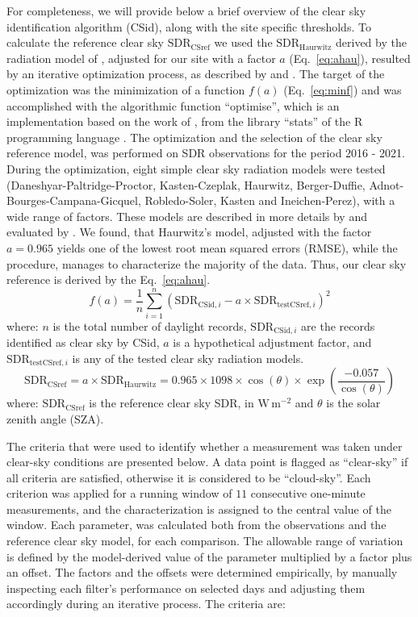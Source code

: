 \documentclass[applsci,article,submit,moreauthors,pdftex]{Definitions/mdpi}
\begin{document}
For completeness, we will provide below a brief overview of the clear
sky identification algorithm (CSid), along with the site specific
thresholds. To calculate the reference clear sky
\(\text{SDR}_\text{CSref}\) we used the \(\text{SDR}_\text{Haurwitz}\)
derived by the radiation model of \citet{Haurwitz1945}, adjusted for our
site with a factor \(a\) (Eq.~\ref{eq:ahau}), resulted by an iterative
optimization process, as described by \citet{Long2000} and
\citet{Reno2016}. The target of the optimization was the minimization of
a function \(f(a)\) (Eq.~\ref{eq:minf}) and was accomplished with the
algorithmic function ``optimise'', which is an implementation based on
the work of \citet{Brent1973}, from the library ``stats'' of the R
programming language \citep{RCT2023}. The optimization and the selection
of the clear sky reference model, was performed on SDR observations for
the period 2016 - 2021. During the optimization, eight simple clear sky
radiation models were tested (Daneshyar-Paltridge-Proctor,
Kasten-Czeplak, Haurwitz, Berger-Duffie, Adnot-Bourges-Campana-Gicquel,
Robledo-Soler, Kasten and Ineichen-Perez), with a wide range of factors.
These models are described in more details by \citet{Reno2012} and
evaluated by \citet{Reno2016}. We found, that Haurwitz's model, adjusted
with the factor \(a = 0.965\) yields one of the lowest root mean squared
errors (RMSE), while the procedure, manages to characterize the majority
of the data. Thus, our clear sky reference is derived by the
Eq.~\ref{eq:ahau}. \begin{equation}
f(a) = \frac{1}{n}\sum_{i=1}^{n} ( \text{SDR}_{\text{CSid},i} - a \times \text{SDR}_{\text{testCSref},i} )^2 \label{eq:minf}
\end{equation} where: \(n\) is the total number of daylight records,
\(\text{SDR}_{\text{CSid},i}\) are the records identified as clear sky
by CSid, \(a\) is a hypothetical adjustment factor, and
\(\text{SDR}_{\text{testCSref},i}\) is any of the tested clear sky
radiation models. \begin{equation}
\text{SDR}_\text{CSref} = a \times \text{SDR}_\text{Haurwitz} = 0.965 \times 1098 \times \cos(\theta) \times \exp \left( \frac{ - 0.057}{\cos(\theta)} \right) \label{eq:ahau}
\end{equation} where: \(\text{SDR}_\text{CSref}\) is the reference clear
sky SDR, in \(\text{W}\,\text{m}^{-2}\) and \(\theta\) is the solar
zenith angle (SZA).

The criteria that were used to identify whether a measurement was taken
under clear-sky conditions are presented below. A data point is flagged
as ``clear-sky'' if all criteria are satisfied, otherwise it is
considered to be ``cloud-sky''. Each criterion was applied for a running
window of \(11\) consecutive one-minute measurements, and the
characterization is assigned to the central value of the window. Each
parameter, was calculated both from the observations and the reference
clear sky model, for each comparison. The allowable range of variation
is defined by the model-derived value of the parameter multiplied by a
factor plus an offset. The factors and the offsets were determined
empirically, by manually inspecting each filter's performance on
selected days and adjusting them accordingly during an iterative
process. The criteria are:
\end{document}
